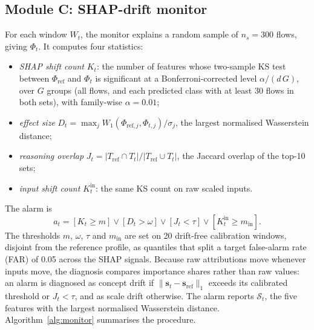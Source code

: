 \documentclass[conference]{IEEEtran}
\begin{document}
\subsection{Module C: SHAP-drift monitor}
For each window $W_t$, the monitor explains a random sample of $n_s=300$ flows, giving $\Phi_t$. It computes four statistics:
\begin{itemize}
\item \textit{SHAP shift count} $K_t$: the number of features whose two-sample KS test between $\Phi_{\text{ref}}$ and $\Phi_t$ is significant at a Bonferroni-corrected level $\alpha/(d\,G)$, over $G$ groups (all flows, and each predicted class with at least 30 flows in both sets), with family-wise $\alpha=0.01$;
\item \textit{effect size} $D_t=\max_j W_1(\Phi_{\text{ref},j},\Phi_{t,j})/\sigma_j$, the largest normalised Wasserstein distance;
\item \textit{reasoning overlap} $J_t=|T_{\text{ref}}\cap T_t|/|T_{\text{ref}}\cup T_t|$, the Jaccard overlap of the top-10 sets;
\item \textit{input shift count} $K^{\text{in}}_t$: the same KS count on raw scaled inputs.
\end{itemize}
The alarm is
\begin{equation}
a_t = [K_t\ge m]\lor[D_t>\omega]\lor[J_t<\tau]\lor[K^{\text{in}}_t\ge m_{\text{in}}].
\end{equation}
The thresholds $m$, $\omega$, $\tau$ and $m_{\text{in}}$ are set on 20 drift-free calibration windows, disjoint from the reference profile, as quantiles that split a target false-alarm rate (FAR) of 0.05 across the SHAP signals. Because raw attributions move whenever inputs move, the diagnosis compares importance shares rather than raw values: an alarm is diagnosed as concept drift if $\|\mathbf{s}_t-\mathbf{s}_{\text{ref}}\|_1$ exceeds its calibrated threshold or $J_t<\tau$, and as scale drift otherwise. The alarm reports $\mathcal{S}_t$, the five features with the largest normalised Wasserstein distance. Algorithm~\ref{alg:monitor} summarises the procedure.
\end{document}
